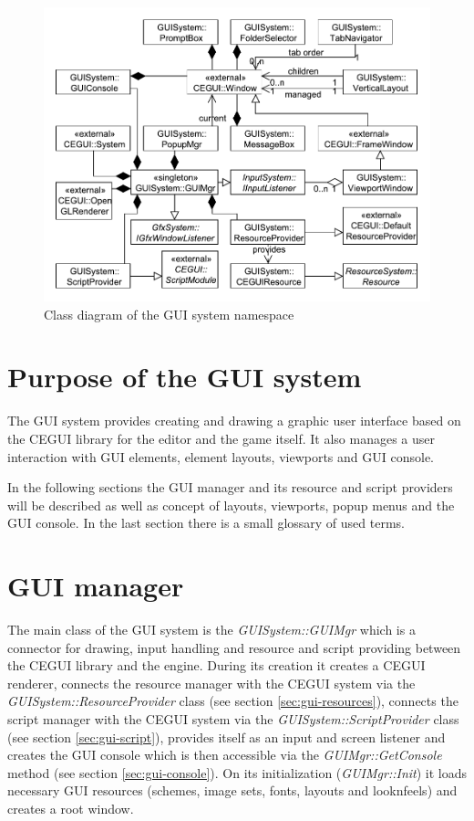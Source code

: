 \documentclass[a4paper, 12pt]{report}
\begin{document}
\begin{figure}[htbp]
	\centering
		\includegraphics[width=1\textwidth]{GUISystemClassDiagram.pdf}
	\caption{Class diagram of the GUI system namespace}
	\label{fig:guisystem-diagram}
\end{figure}

\section{Purpose of the GUI system}

The GUI system provides creating and drawing a graphic user interface based on the CEGUI library for the editor and the game itself. It also manages a user interaction with GUI elements, element layouts, viewports and GUI console.

In the following sections the GUI manager and its resource and script providers will be described as well as concept of layouts, viewports, popup menus and the GUI console. In the last section there is a small glossary of used terms.

\section{GUI manager}

The main class of the GUI system is the \emph{GUISystem::GUIMgr} which is a connector for drawing, input handling and resource and script providing between the CEGUI library and the engine. During its creation it creates a CEGUI renderer, connects the resource manager with the CEGUI system via the \emph{GUISystem::Resource\-Provider} class (see section \ref{sec:gui-resources}), connects the script manager with the CEGUI system via the \emph{GUISystem::ScriptProvider} class (see section \ref{sec:gui-script}), provides itself as an input and screen listener and creates the GUI console which is then accessible via the \emph{GUIMgr::GetConsole} method (see section \ref{sec:gui-console}). On its initialization (\emph{GUIMgr::Init}) it loads necessary GUI resources (schemes, image sets, fonts, layouts and looknfeels) and creates a root window.
\end{document}
